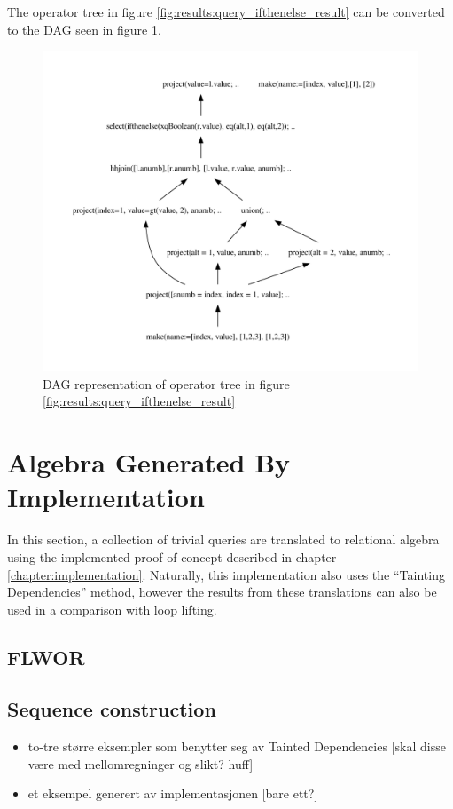 The operator tree in figure \ref{fig:results:query_ifthenelse_result} can be
converted to the DAG seen in figure \ref{fig:results:query_ifthenelse_result_dag}.

\newpage

\begin{figure}[!htp]
  \includegraphics[scale=0.7]{img/graphs/ifthenelse_dag}
  \caption{DAG representation of operator tree in figure
  \ref{fig:results:query_ifthenelse_result}}
  \label{fig:results:query_ifthenelse_result_dag}
\end{figure}


\section{Algebra Generated By Implementation}
In this section, a collection of trivial queries are translated to relational
algebra using the implemented proof of concept described in chapter
\ref{chapter:implementation}. Naturally, this implementation also uses the
``Tainting Dependencies'' method, however the results from these translations
can also be used in a comparison with loop lifting.

\subsection{FLWOR}


\subsection{Sequence construction}

\begin{itemize}
  \item to-tre større eksempler som benytter seg av Tainted Dependencies [skal
  disse v\ae re med mellomregninger og slikt? huff]
  \item et eksempel generert av implementasjonen [bare ett?]
\end{itemize}